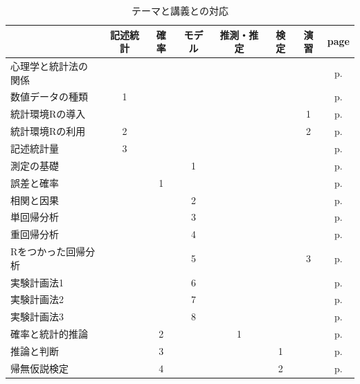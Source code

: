 \documentclass[dvipsnames]{ltjsarticle}
\begin{document}
\begin{table}
	\centering
	\caption{テーマと講義との対応}
	\label{processTable}
	\begin{tabular}[t]{lccccccc}
		             & 記述統計 & 確率 & モデル & 推測・推定 & 検定 & 演習 & page                                 \\\hline\hline
		心理学と統計法の関係   &      &    &     &       &    &    & p.\pageref{s01_Introduction}         \\
		数値データの種類     & 1    &    &     &       &    &    & p.\pageref{s02_Numbers}              \\
		統計環境Rの導入     &      &    &     &       &    & 1  & p.\pageref{s03_introR}               \\
		統計環境Rの利用     & 2    &    &     &       &    & 2  & p.\pageref{s04_usingR}               \\
		記述統計量        & 3    &    &     &       &    &    & p.\pageref{s05_descriptives}         \\
		測定の基礎        &      &    & 1   &       &    &    & p.\pageref{s06_ctt}                  \\
		誤差と確率        &      & 1  &     &       &    &    & p.\pageref{s07_probability}          \\
		相関と因果        &      &    & 2   &       &    &    & p.\pageref{s08_CorrelationCausation} \\
		単回帰分析        &      &    & 3   &       &    &    & p.\pageref{s09_Regression}           \\
		重回帰分析        &      &    & 4   &       &    &    & p.\pageref{s10_MultipleRegression}   \\
		Rをつかった回帰分析   &      &    & 5   &       &    & 3  & p.\pageref{s11_Regression_onR}       \\
		実験計画法1       &      &    & 6   &       &    &    & p.\pageref{s12_design1}              \\
		実験計画法2       &      &    & 7   &       &    &    & p.\pageref{s13_design2}              \\
		実験計画法3       &      &    & 8   &       &    &    & p.\pageref{s14_design3}              \\\hline
		確率と統計的推論     &      & 2  &     & 1     &    &    & p.\pageref{s16_inference}            \\
		推論と判断        &      & 3  &     &       & 1  &    & p.\pageref{s17_estimation_and_test}  \\
		帰無仮説検定       &      & 4  &     &       & 2  &    & p.\pageref{s18_NHST}                 \\

\end{tabular}
\end{table}
\end{document}
